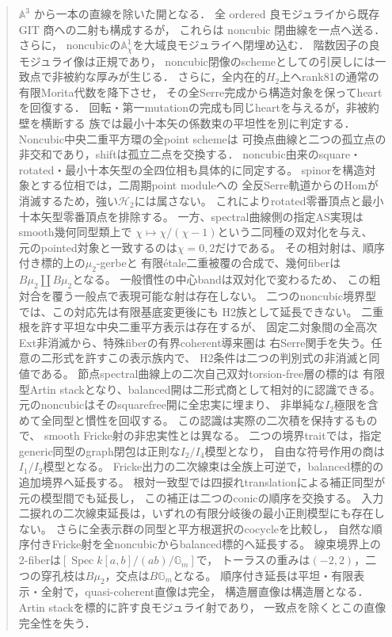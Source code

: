 \documentclass[a4paper,11pt]{ltjsarticle}
\numberwithin{equation}{section}
\theoremstyle{plain}
\theoremstyle{definition}
\theoremstyle{remark}
\newcommand{\Gm}{\mathbb G_m}
\newcommand{\HH}{\mathcal H_2}
\DeclareMathOperator{\Spec}{Spec}
\begin{document}
\begin{abstract}
$\mathbb A^3$ から一本の直線を除いた開となる．
全 ordered 良モジュライから既存 GIT 商への二射も構成するが，
これらは noncubic 閉曲線を一点へ送る．さらに，
noncubicの$\mathbb A^1_\chi$を大域良モジュライへ閉埋め込む．
階数因子の良モジュライ像は正規であり，
noncubic閉像のschemeとしての引戻しには一致点で非被約な厚みが生じる．
さらに，全内在的$H_2$上へrank81の通常の有限Morita代数を降下させ，
その全Serre完成から構造対象を保ってheartを回復する．
回転・第一mutationの完成も同じheartを与えるが，非被約壁を横断する
族では最小十本矢の係数束の平坦性を別に判定する．
Noncubic中央二重平方環の全point schemeは
可換点曲線と二つの孤立点の非交和であり，shiftは孤立二点を交換する．
noncubic由来のsquare・rotated・最小十本矢型の全四位相も具体的に同定する。
spinorを構造対象とする位相では，二周期point moduleへの
全反Serre軌道からのHomが消滅するため，強い$\HH$には属さない。
これによりrotated零番頂点と最小十本矢型零番頂点を排除する。
一方、spectral曲線側の指定AS実現はsmooth幾何同型類上で
$\chi\mapsto\chi/(\chi-1)$という二同種の双対化を与え、
元のpointed対象と一致するのは$\chi=0,2$だけである。
その相対射は、順序付き標的上の$\mu_2$-gerbeと
有限\'{e}tale二重被覆の合成で、幾何fiberは$B\mu_2\amalg B\mu_2$となる。
一般慣性の中心bandは双対化で変わるため、
この粗対合を覆う一般点で表現可能な射は存在しない。
二つのnoncubic境界型では、この対応先は有限基底変更後にも
H2族として延長できない。
二重根を許す平坦な中央二重平方表示は存在するが、
固定二対象間の全高次Ext非消滅から、特殊fiberの有界coherent導来圏は
右Serre関手を失う。任意の二形式を許すこの表示族内で、
H2条件は二つの判別式の非消滅と同値である。
節点spectral曲線上の二次自己双対torsion-free層の標的は
有限型Artin stackとなり、balanced開は二形式商として相対的に認識できる。
元のnoncubicはそのsquarefree開に全忠実に埋まり、
非単純な$I_2$極限を含めて全同型と慣性を回収する。
この認識は実際の二次積を保持するもので、
smooth Fricke射の非忠実性とは異なる。
二つの境界traitでは，指定generic同型のgraph閉包は正則な$I_2/I_4$模型となり，
自由な符号作用の商は$I_1/I_2$模型となる。
Fricke出力の二次線束は全族上可逆で，balanced標的の追加境界へ延長する。
根対一致型では四捩れtranslationによる補正同型が元の模型間でも延長し，
この補正は二つのconicの順序を交換する。
入力二捩れの二次線束延長は，いずれの有限分岐後の最小正則模型にも存在しない。
さらに全表示群の同型と平方根選択のcocycleを比較し，
自然な順序付きFricke射を全noncubicからbalanced標的へ延長する。
線束境界上の2-fiberは$[\Spec k[a,b]/(ab)/\Gm]$で，
トーラスの重みは$(-2,2)$，二つの穿孔枝は$B\mu_2$，交点は$B\Gm$となる。
順序付き延長は平坦・有限表示・全射で，quasi-coherent直像は完全，
構造層直像は構造層となる．Artin stackを標的に許す良モジュライ射であり，
一致点を除くとこの直像完全性を失う．



\end{abstract}
\end{document}
